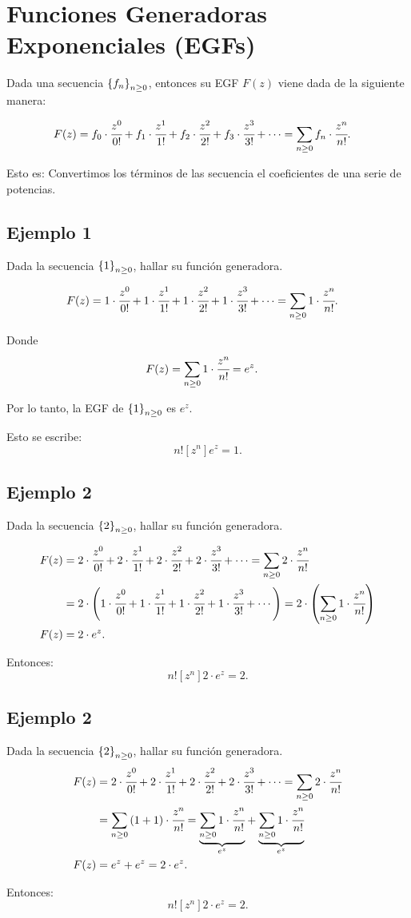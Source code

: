\section{Funciones Generadoras Exponenciales (EGFs)}

Dada una secuencia $\left\{f_n\right\}_{n\geq0}$, entonces su EGF $F(z)$ viene dada de la siguiente manera:

\begin{align*}
F(z)&=f_0\cdot\cfrac{z^{0}}{0!}+f_1\cdot\cfrac{z^{1}}{1!}+f_2\cdot\cfrac{z^{2}}{2!}+f_3\cdot\cfrac{z^{3}}{3!}+\cdots=\sum_{n\geq0}{f_n\cdot \cfrac{z^{n}}{n!}}.
\end{align*}

Esto es: Convertimos los términos de las secuencia el coeficientes de una serie de potencias.

\subsection{Ejemplo 1}

Dada la secuencia $\left\{1\right\}_{n\geq0}$, hallar su función generadora.

\begin{align*}
F(z)&=1\cdot\cfrac{z^{0}}{0!}+1\cdot\cfrac{z^{1}}{1!}+1\cdot\cfrac{z^{2}}{2!}+1\cdot\cfrac{z^{3}}{3!}+\cdots=\sum_{n\geq0}{1\cdot \cfrac{z^{n}}{n!}}.
\end{align*}

Donde 
\begin{align*}
F(z)&=\sum_{n\geq0}{1\cdot\cfrac{z^{n}}{n!}}=e^z.
\end{align*}

Por lo tanto, la EGF de $\left\{1\right\}_{n\geq0}$ es $e^z$.

Esto se escribe:
$$n![z^n]e^z=1.$$

\subsection{Ejemplo 2}
Dada la secuencia $\left\{2\right\}_{n\geq0}$, hallar su función generadora.

\begin{align*}
F(z)&=2\cdot\cfrac{z^{0}}{0!}+2\cdot\cfrac{z^{1}}{1!}+2\cdot\cfrac{z^{2}}{2!}+2\cdot\cfrac{z^{3}}{3!}+\cdots=\sum_{n\geq0}{2\cdot \cfrac{z^{n}}{n!}}\\
&=2\cdot\left(1\cdot\cfrac{z^{0}}{0!}+1\cdot\cfrac{z^{1}}{1!}+1\cdot\cfrac{z^{2}}{2!}+1\cdot\cfrac{z^{3}}{3!}+\cdots\right)=2\cdot\left(\sum_{n\geq0}{1\cdot\cfrac{z^{n}}{n!}}\right)\\
F(z)&=2\cdot e^z.
\end{align*}

Entonces:
$$n![z^n]2\cdot e^z=2.$$

\subsection{Ejemplo 2}
Dada la secuencia $\left\{2\right\}_{n\geq0}$, hallar su función generadora.
%
\begin{align*}
F(z)&=2\cdot\cfrac{z^{0}}{0!}+2\cdot\cfrac{z^{1}}{1!}+2\cdot\cfrac{z^{2}}{2!}+2\cdot\cfrac{z^{3}}{3!}+\cdots=\sum_{n\geq0}{2\cdot \cfrac{z^{n}}{n!}}\\
&=
\sum_{n\geq0}{(1+1)\cdot \cfrac{z^{n}}{n!}}=\underset{e^z}{\underbrace{\sum_{n\geq0}{1\cdot \cfrac{z^{n}}{n!}}}}+\underset{e^z}{\underbrace{\sum_{n\geq0}{1\cdot \cfrac{z^{n}}{n!}}}}\\
F(z)&=e^z+e^z=2\cdot e^z.
\end{align*}

Entonces:
$$n![z^n]2\cdot e^z=2.$$